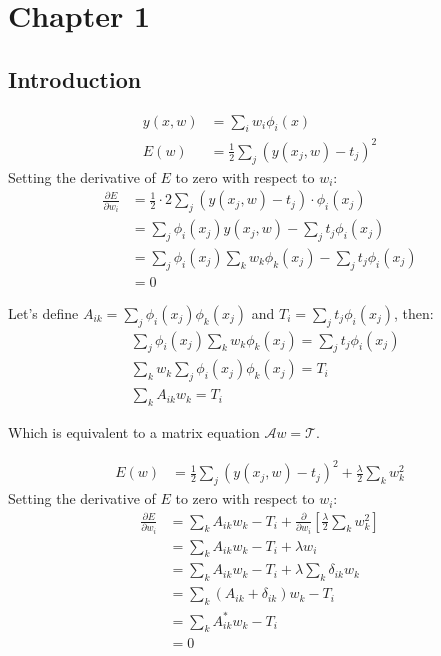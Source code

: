 \section*{Chapter 1}
\subsection*{Introduction}
\setcounter{subsection}{1}

\begin{problem}
  \begin{align*}
    y(x, w) &= \sum_i w_i \phi_i(x) \\
    E(w)    &= \frac{1}{2} \sum_j \left(y(x_j, w) - t_j\right)^2
  \end{align*}
  Setting the derivative of $E$ to zero with respect to $w_i$:
  \begin{align*}
    \frac{\partial E}{\partial w_i} &=
      \frac{1}{2} \cdot 2 \sum_j \left(y(x_j, w) - t_j\right) \cdot \phi_i(x_j) \\
      &= \sum_j \phi_i(x_j) y(x_j, w) - \sum_j t_j \phi_i(x_j) \\
      &= \sum_j \phi_i(x_j) \sum_k w_k \phi_k(x_j) - \sum_j t_j \phi_i(x_j) \\
      &= 0
  \end{align*}

  Let's define $A_{ik} = \sum_j \phi_i(x_j) \phi_k(x_j)$ and $T_i = \sum_j t_j \phi_i(x_j)$, then:
  \begin{align*}
    &\sum_j \phi_i(x_j)\sum_k w_k \phi_k(x_j) = \sum_j t_j \phi_i(x_j) \\
    &\sum_k w_k \sum_j \phi_i(x_j) \phi_k(x_j) = T_i \\
    &\sum_k A_{ik} w_k  = T_i
  \end{align*}

  Which is equivalent to a matrix equation $\mathcal{A} w = \mathcal{T}$.
\end{problem}

\begin{problem}
  \begin{align*}
    E(w)    &= \frac{1}{2} \sum_j \left(y(x_j, w) - t_j\right)^2 + \frac{\lambda}{2}\sum_k w_k^2
  \end{align*}
  Setting the derivative of $E$ to zero with respect to $w_i$:
  \begin{align*}
    \frac{\partial E}{\partial w_i} &=
      \sum_k A_{ik} w_k - T_i + \frac{\partial}{\partial w_i}\left[\frac{\lambda}{2}\sum_k w_k^2\right] \\
      &= \sum_k A_{ik} w_k - T_i + \lambda w_i \\
      &= \sum_k A_{ik} w_k - T_i + \lambda \sum_k \delta_{ik} w_k \\
      &= \sum_k (A_{ik} + \delta_{ik}) w_k - T_i \\
      &= \sum_k A^{*}_{ik} w_k - T_i \\
      &= 0
  \end{align*}
\end{problem}

